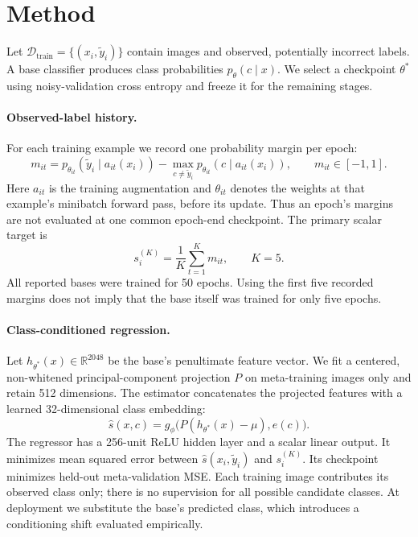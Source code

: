 \section{Method}
\label{sec:method}
Let $\mathcal D_{\mathrm{train}}=\{(x_i,\tilde y_i)\}$ contain images and observed, potentially incorrect labels. A base classifier produces class probabilities $p_{\theta}(c\mid x)$. We select a checkpoint $\theta^*$ using noisy-validation cross entropy and freeze it for the remaining stages.

\paragraph{Observed-label history.}
For each training example we record one probability margin per epoch:
\begin{equation}
 m_{it}=p_{\theta_{it}}(\tilde y_i\mid a_{it}(x_i))-
 \max_{c\ne\tilde y_i}p_{\theta_{it}}(c\mid a_{it}(x_i)),\qquad m_{it}\in[-1,1].
\end{equation}
Here $a_{it}$ is the training augmentation and $\theta_{it}$ denotes the weights at that example's minibatch forward pass, before its update. Thus an epoch's margins are not evaluated at one common epoch-end checkpoint. The primary scalar target is
\begin{equation}
 s_i^{(K)}=\frac1K\sum_{t=1}^{K}m_{it},\qquad K=5.
\end{equation}
All reported bases were trained for 50 epochs. Using the first five recorded margins does not imply that the base itself was trained for only five epochs.

\paragraph{Class-conditioned regression.}
Let $h_{\theta^*}(x)\in\mathbb R^{2048}$ be the base's penultimate feature vector. We fit a centered, non-whitened principal-component projection $P$ on meta-training images only and retain 512 dimensions. The estimator concatenates the projected features with a learned 32-dimensional class embedding:
\begin{equation}
 \hat s(x,c)=g_{\phi}\big(P(h_{\theta^*}(x)-\mu),e(c)\big).
\end{equation}
The regressor has a 256-unit ReLU hidden layer and a scalar linear output. It minimizes mean squared error between $\hat s(x_i,\tilde y_i)$ and $s_i^{(K)}$. Its checkpoint minimizes held-out meta-validation MSE. Each training image contributes its observed class only; there is no supervision for all possible candidate classes. At deployment we substitute the base's predicted class, which introduces a conditioning shift evaluated empirically.

